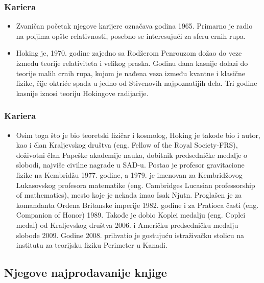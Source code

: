 \documentclass{beamer}
\begin{document}
\begin{frame}[fragile]\frametitle{Kariera}
\begin{itemize}	 \fontsize{9}{6}\selectfont
\item  Zvaničan početak njegove karijere označava godina 1965. Primarno je radio na poljima opšte relativnosti, posebno se interesujući za sferu crnih rupa.
\item Hoking je, 1970. godine zajedno sa Rodžerom Penrouzom dožao do veze između teorije relativiteta i velikog praska. Godinu dana kasnije dolazi do teorije malih crnih rupa, kojom je nađena veza između kvantne i klasične fizike, čije oktriće spada u jedno od Stivenovih najpoznatijih dela. Tri godine kasnije iznosi teoriju Hokingove radijacije. 
\end{itemize}
\end{frame}
\begin{frame}[fragile]\frametitle{Kariera}
	\begin{itemize}	 \fontsize{9}{6}\selectfont	
	\item  Osim toga što je bio teoretski fizičar i kosmolog, Hoking je takođe bio i autor, kao i član Kraljevskog društva (eng. Fellow of the Royal Society-FRS), doživotni član Papeške akademije nauka, dobitnik predsedničke medalje o slobodi, najviše civilne nagrade u SAD-u.	 Postao je profesor gravitacione fizike na Kembridžu 1977. godine, a 1979. je imenovan za Kembridžovog Lukasovskog profesora matematike (eng. Cambridges Lucasian professorship of mathematics), mesto koje je nekada imao Isak Njutn. Proglašen je za komandanta Ordena Britanske imperije 1982. godine i za Pratioca časti (eng. Companion of Honor) 1989. Takođe je dobio Koplei medalju (eng. Coplei medal) od Kraljevskog društva 2006. i Američku predsedničku medalju slobode 2009. Godine 2008. prihvatio je gostujuću istraživačku stolicu na institutu za teorijsku fiziku Perimeter u Kanadi.
	\end{itemize}
	\end{frame}
\subsection{Njegove najprodavanije knjige}
\end{document}
